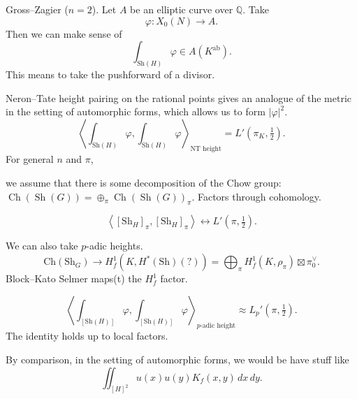 \documentclass[reqno]{amsart} 
\begin{document}
\begin{example}\label{example:cnfg5j3x18}
  Gross--Zagier ($n = 2$).  Let $A$ be an elliptic curve over $\mathbb{Q}$.  Take
  \begin{equation*}
    \varphi : X_0(N) \rightarrow A.
  \end{equation*}
  Then we can make sense of
  \begin{equation*}
    \int_{\mathrm{Sh}(H)} \varphi \in A(K^{\mathrm{ab}}).
  \end{equation*}
  This means to take the pushforward of a divisor.

  Neron--Tate height pairing on the rational points gives an analogue of the metric in the setting of automorphic forms, which allows us to form $\lvert \varphi \rvert^2$.
  \begin{equation*}
    \left\langle
      \int_{\mathrm{Sh}(H)} \varphi,
      \int_{\mathrm{Sh}(H)} \varphi
    \right\rangle_{\mathrm{NT} \text{ height}} = L '(\pi_K, \tfrac{1}{2}).
  \end{equation*}
  For general $n$ and $\pi$,

  we assume that there is some decomposition of the Chow group: $\operatorname{Ch}(\operatorname{Sh}(G)) = \oplus_\pi \operatorname{Ch}(\operatorname{Sh}(G))_\pi$.  Factors through cohomology.
  
  \begin{equation*}
    \left\langle [\mathrm{Sh}_H]_\pi, [\mathrm{Sh}_H]_\pi \right\rangle
    \leftrightarrow
    L '(\pi, \tfrac{1}{2}).
  \end{equation*}

  We can also take $p$-adic heights.
  \begin{equation*}
    \mathrm{Ch}(\mathrm{Sh}_G) \rightarrow  H^1_f(K, H^\ast(\mathrm{Sh})(?))
    = \bigoplus_\pi H_f^1(K, \rho_\pi) \boxtimes \pi_0^\vee.
  \end{equation*}
  Block--Kato Selmer maps(t) the $H^1_f$ factor.

  \begin{theorem}\label{theorem:cnfg5jyfj8}
    \begin{equation*}
      \left\langle \int_{[\mathrm{Sh}(H)]} \varphi, \int_{[\mathrm{Sh}(H)]} \varphi \right\rangle_{\text{$p$-adic height}}
      \approx L_p '(\pi , \tfrac{1}{2}).
    \end{equation*}
    The identity holds up to local factors.
  \end{theorem}

  By comparison, in the setting of automorphic forms, we would be have stuff like
  \begin{equation*}
    \iint_{[H]^2 } u(x) u(y) K_f(x,y) \, d x \, d y.
  \end{equation*}

  
\end{example}
\end{document}
